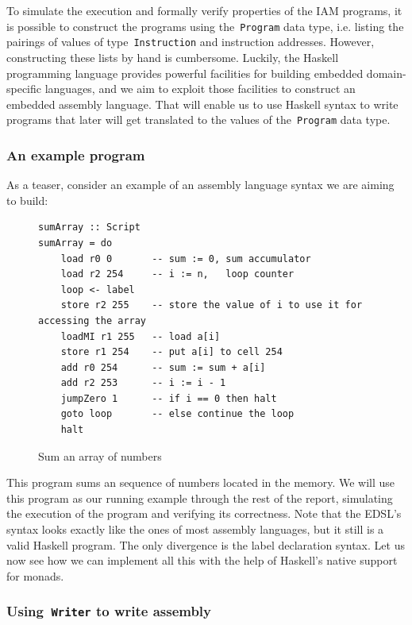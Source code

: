 To simulate the execution and formally verify properties of the IAM programs,
it is possible to construct the programs using the~\texttt{Program} data type, i.e.
listing the pairings of values of type~\texttt{Instruction} and instruction addresses.
However, constructing these lists by hand is cumbersome. Luckily, the Haskell programming
language provides powerful facilities for building embedded domain-specific languages, and
we aim to exploit those facilities to construct an embedded assembly language.
That will enable us to use Haskell syntax to write programs that later will get translated
to the values of the~\texttt{Program} data type.

\subsubsection{An example program}

As a teaser, consider an example of an assembly language syntax we are aiming to build:

\begin{figure}[H]
\begin{verbatim}
sumArray :: Script
sumArray = do
    load r0 0       -- sum := 0, sum accumulator
    load r2 254     -- i := n,   loop counter
    loop <- label
    store r2 255    -- store the value of i to use it for accessing the array
    loadMI r1 255   -- load a[i]
    store r1 254    -- put a[i] to cell 254
    add r0 254      -- sum := sum + a[i]
    add r2 253      -- i := i - 1
    jumpZero 1      -- if i == 0 then halt
    goto loop       -- else continue the loop
    halt
\end{verbatim}
\caption{Sum an array of numbers}
\label{syntaxExample}
\end{figure}

This program sums an sequence of numbers located in the memory. We will use this program as
our running example through the rest of the report, simulating the execution of the program
and verifying its correctness. Note that the EDSL's syntax looks exactly like the ones of most
assembly languages, but it still is a valid Haskell program. The only
divergence is the label declaration syntax. Let us now see how we can implement
all this with the help of Haskell's native support for monads.

\subsubsection{Using~\texttt{Writer} to write assembly}

